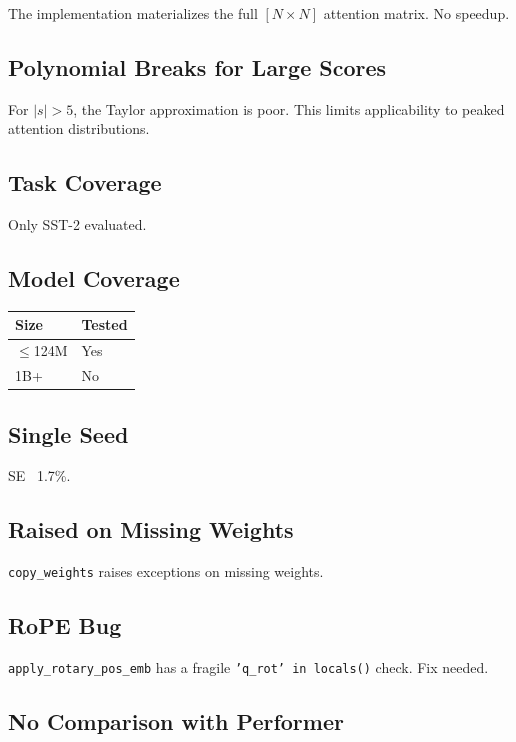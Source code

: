 The implementation materializes the full $[N \times N]$ attention matrix. 
No speedup.

\subsection{Polynomial Breaks for Large Scores}

For $|s| > 5$, the Taylor approximation is poor. This limits applicability 
to peaked attention distributions.

\subsection{Task Coverage}

Only SST-2 evaluated.

\subsection{Model Coverage}

\begin{table}[H]
\centering
\small
\begin{tabular}{ll}
\toprule
\textbf{Size} & \textbf{Tested} \\
\midrule
$\le$124M & Yes \\
1B+ & No \\
\bottomrule
\end{tabular}
\end{table}

\subsection{Single Seed}

SE ~1.7\%.

\subsection{Raised on Missing Weights}

\texttt{copy\_weights} raises exceptions on missing weights.

\subsection{RoPE Bug}

\texttt{apply\_rotary\_pos\_emb} has a fragile \texttt{'q\_rot' in locals()} check. Fix needed.

\subsection{No Comparison with Performer}

